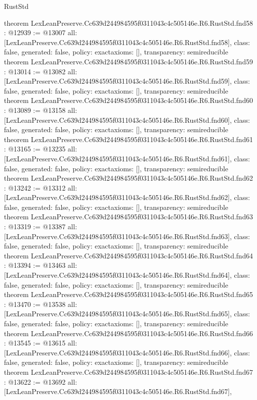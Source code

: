 \begin{lexlean}{RustStd}
\begin{coremodule}
{}
theorem LexLeanPreserve.Cc639d244984595f0311043c4c505146e.R6.RustStd.fnd58 : @12939 := @13007 {
  all: [LexLeanPreserve.Cc639d244984595f0311043c4c505146e.R6.RustStd.fnd58],
  class: false,
  generated: false,
  policy: exact{axioms: []},
  transparency: semireducible
}
theorem LexLeanPreserve.Cc639d244984595f0311043c4c505146e.R6.RustStd.fnd59 : @13014 := @13082 {
  all: [LexLeanPreserve.Cc639d244984595f0311043c4c505146e.R6.RustStd.fnd59],
  class: false,
  generated: false,
  policy: exact{axioms: []},
  transparency: semireducible
}
theorem LexLeanPreserve.Cc639d244984595f0311043c4c505146e.R6.RustStd.fnd60 : @13089 := @13158 {
  all: [LexLeanPreserve.Cc639d244984595f0311043c4c505146e.R6.RustStd.fnd60],
  class: false,
  generated: false,
  policy: exact{axioms: []},
  transparency: semireducible
}
theorem LexLeanPreserve.Cc639d244984595f0311043c4c505146e.R6.RustStd.fnd61 : @13165 := @13235 {
  all: [LexLeanPreserve.Cc639d244984595f0311043c4c505146e.R6.RustStd.fnd61],
  class: false,
  generated: false,
  policy: exact{axioms: []},
  transparency: semireducible
}
theorem LexLeanPreserve.Cc639d244984595f0311043c4c505146e.R6.RustStd.fnd62 : @13242 := @13312 {
  all: [LexLeanPreserve.Cc639d244984595f0311043c4c505146e.R6.RustStd.fnd62],
  class: false,
  generated: false,
  policy: exact{axioms: []},
  transparency: semireducible
}
theorem LexLeanPreserve.Cc639d244984595f0311043c4c505146e.R6.RustStd.fnd63 : @13319 := @13387 {
  all: [LexLeanPreserve.Cc639d244984595f0311043c4c505146e.R6.RustStd.fnd63],
  class: false,
  generated: false,
  policy: exact{axioms: []},
  transparency: semireducible
}
theorem LexLeanPreserve.Cc639d244984595f0311043c4c505146e.R6.RustStd.fnd64 : @13394 := @13463 {
  all: [LexLeanPreserve.Cc639d244984595f0311043c4c505146e.R6.RustStd.fnd64],
  class: false,
  generated: false,
  policy: exact{axioms: []},
  transparency: semireducible
}
theorem LexLeanPreserve.Cc639d244984595f0311043c4c505146e.R6.RustStd.fnd65 : @13470 := @13538 {
  all: [LexLeanPreserve.Cc639d244984595f0311043c4c505146e.R6.RustStd.fnd65],
  class: false,
  generated: false,
  policy: exact{axioms: []},
  transparency: semireducible
}
theorem LexLeanPreserve.Cc639d244984595f0311043c4c505146e.R6.RustStd.fnd66 : @13545 := @13615 {
  all: [LexLeanPreserve.Cc639d244984595f0311043c4c505146e.R6.RustStd.fnd66],
  class: false,
  generated: false,
  policy: exact{axioms: []},
  transparency: semireducible
}
theorem LexLeanPreserve.Cc639d244984595f0311043c4c505146e.R6.RustStd.fnd67 : @13622 := @13692 {
  all: [LexLeanPreserve.Cc639d244984595f0311043c4c505146e.R6.RustStd.fnd67],
}
\end{coremodule}
\end{lexlean}
